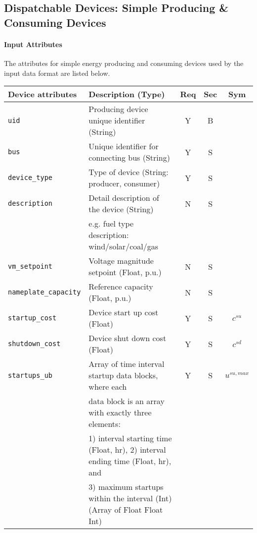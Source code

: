 \documentclass{article}
\begin{document}
\subsection{Dispatchable Devices: Simple Producing \& Consuming Devices}
\label{nom:gen_single}
\paragraph{Input Attributes} The attributes for
simple energy producing and consuming devices used by the input data format are listed below.
\begin{center}
\small
\begin{tabular}{ l | l | c | c | c |}
Device attributes & Description (Type) & Req & Sec & Sym\\
\hline
  {\tt uid} & Producing device unique identifier (String) & Y & B &  \\
  {\tt bus} & Unique identifier for connecting bus (String)& Y & S & \\
  {\tt device\_type} & Type of device (String: producer, consumer) & Y & S & \\
  {\tt description} & Detail description of the device  (String) & N & S & \\
      &e.g. fuel type description: wind/solar/coal/gas  &  &  & \\
  {\tt vm\_setpoint} & Voltage magnitude setpoint (Float, p.u.) & N & S & \\
  {\tt nameplate\_capacity} & Reference capacity (Float, p.u.) & N & S & \\
  {\tt startup\_cost} & Device start up cost (Float) & Y & S & $c^{su}$\\
  {\tt shutdown\_cost} & Device shut down cost (Float) & Y & S & $c^{sd}$\\
  {\tt startups\_ub} & Array of time interval startup data blocks, where each & Y & S & $u^{su,max}$\\
                     & data block is an array with exactly three elements: &   &   & \\
                     & 1) interval starting time (Float, hr), 2) interval ending time (Float, hr), and &   &   & \\
                     & 3) maximum startups within the interval (Int) (Array of Float Float Int) &   &   & \\


\end{tabular}
\end{center}
\end{document}
